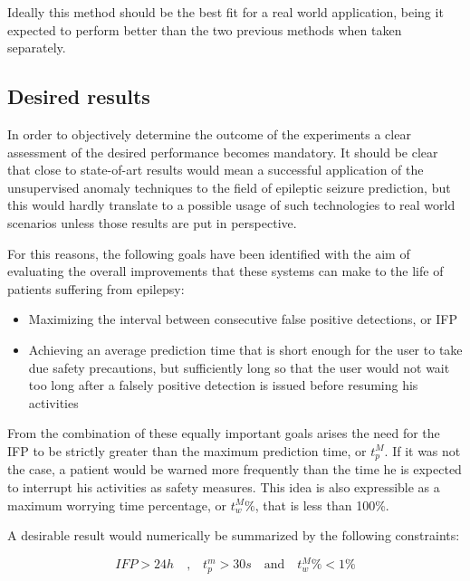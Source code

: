 Ideally this method should be the best fit for a real world application, being it expected to perform better than the two previous methods when taken separately.

\subsection{Desired results}
In order to objectively determine the outcome of the experiments a clear assessment of the desired performance becomes mandatory.
It should be clear that close to state-of-art results would mean a successful application of the unsupervised anomaly techniques to the field of epileptic seizure prediction, but this would hardly translate to a possible usage of such technologies to real world scenarios unless those results are put in perspective.

For this reasons, the following goals have been identified with the aim of evaluating the overall improvements that these systems can make to the life of patients suffering from epilepsy:

\begin{itemize}
    \item Maximizing the interval between consecutive false positive detections, or \gls{IFP}
    \item Achieving an average prediction time that is short enough for the user to take due safety precautions, but sufficiently long so that the user would not wait too long after a falsely positive detection is issued before resuming his activities
\end{itemize}

From the combination of these equally important goals arises the need for the \gls{IFP} to be strictly greater than the maximum prediction time, or $t_p^M$. If it was not the case, a patient would be warned more frequently than the time he is expected to interrupt his activities as safety measures.
This idea is also expressible as a maximum worrying time percentage, or $t_w^M\%$, that is less than 100\%.

A desirable result would numerically be summarized by the following constraints:

\begin{equation} \label{eq:app-constraints}
    IFP > 24 h
    \quad\text{,}\quad 
    t_p^m > 30 s
    \quad\text{and}\quad
    t_w^M\% < 1\%
\end{equation}

